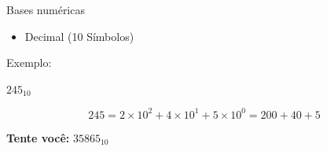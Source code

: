 

\begin{frame}{Bases numéricas}
    \begin{itemize}
        \item Decimal (10 Símbolos)
    \end{itemize}

    \vspace{0.5cm}

    Exemplo:

    \begin{center}
        $245_{10}$
    \end{center}

    \[
        245 = 2 \times 10^{2}
        + 4 \times 10^{1}
        + 5 \times 10^{0}
        = 200 + 40 + 5
    \]

    \vspace{0.5cm}

    \textbf{Tente você:} $35865_{10}$
\end{frame}